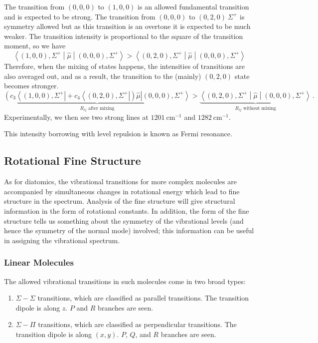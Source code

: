 \documentclass{article}
\theoremstyle{plain}\theoremheaderfont{\normalfont\itshape}\theorembodyfont{\rmfamily}\theoremseparator{.}\newtheorem*{rem}{Remark}\newtheorem*{ex}{Example}\newtheorem*{proof}{Proof}\newtheorem*{altp}{Alternative proof}
\theoremstyle{plain}\theoremheaderfont{\normalfont\bfseries}\theorembodyfont{\rmfamily}\theoremseparator{.}\newtheorem{thm}{Theorem}[section]\newtheorem{lem}[thm]{Lemma}\newtheorem{prop}[thm]{Proposition}\newtheorem*{cor}{Corollary}\newtheorem{defn}[thm]{Definition}\newtheorem{clm}[thm]{Claim}\newtheorem{clminproof}{Claim}\newtheorem{pos}{Postulate}[section]
\theoremstyle{break}\theoremheaderfont{\normalfont\itshape}\theorembodyfont{\rmfamily}\theoremseparator{.\medskip}\newtheorem*{proofskip}{Proof}\newtheorem*{exs}{Examples}\newtheorem*{rems}{Remarks}
\theoremstyle{break}\theoremheaderfont{\normalfont\bfseries}\theorembodyfont{\rmfamily}\theoremseparator{.\medskip}\newtheorem{lemskip}[thm]{Lemma}\newtheorem{defnskip}[thm]{Definition}\newtheorem{propskip}[thm]{Proposition}\newtheorem{thmskip}[thm]{Theorem}
\numberwithin{equation}{section}
\newcommand{\unit}[1]{\ \mathrm{#1}}
\newcommand{\bra}[1]{\left\langle #1 \right|}
\newcommand{\ket}[1]{\left| #1 \right\rangle}
\newcommand{\mel}[3]{\left\langle #1 \middle| #2 \middle| #3 \right\rangle}
\begin{document}
    The transition from \((0,0,0)\) to \((1,0,0)\) is an allowed fundamental transition and is expected to be strong. The transition from \((0,0,0)\) to \((0,2,0)\ \Sigma^+\) is symmetry allowed but as this transition is an overtone it is expected to be much weaker. The transition intensity is proportional to the square of the transition moment, so we have
    \begin{equation}
        \mel{(1,0,0),\Sigma^+}{\hat{\mu}}{(0,0,0),\Sigma^+}>\mel{(0,2,0),\Sigma^+}{\hat{\mu}}{(0,0,0),\Sigma^+}
    \end{equation}
    Therefore, when the mixing of states happens, the intensities of transitions are also averaged out, and as a result, the transition to the (mainly) \((0,2,0)\) state becomes stronger.
    \begin{equation}
        \underbrace{\left(c_3\bra{(1,0,0),\Sigma^+}+c_4\bra{(0,2,0),\Sigma^+}\right)\hat{\mu}\ket{(0,0,0),\Sigma^+}}_{R_{ij}\text{ after mixing}}>\underbrace{\mel{(0,2,0),\Sigma^+}{\hat{\mu}}{(0,0,0),\Sigma^+}}_{R_{ij}\text{ without mixing}}\,.
    \end{equation}
    Experimentally, we then see two strong lines at \(1201\unit{cm}^{-1}\) and \(1282\unit{cm}^{-1}\).

    This intensity borrowing with level repulsion is known as Fermi resonance.

    \subsection{Rotational Fine Structure}
    As for diatomics, the vibrational transitions for more complex molecules are accompanied by simultaneous changes in rotational energy which lead to fine structure in the spectrum. Analysis of the fine structure will give structural information in the form of rotational constants. In addition, the form of the fine structure tells us something about the symmetry of the vibrational levels (and hence the symmetry of the normal mode) involved; this information can be useful in assigning the vibrational spectrum.
    \subsubsection{Linear Molecules}
    The allowed vibrational transitions in such molecules come in two broad types:
    \begin{enumerate}[topsep=0pt,label=(\roman*)]
        \item \(\Sigma-\Sigma\) transitions, which are classified as parallel transitions. The transition dipole is along \(z\). \(P\) and \(R\) branches are seen.
        \item \(\Sigma-\Pi\) transitions, which are classified as perpendicular transitions. The transition dipole is along \((x,y)\). \(P\), \(Q\), and \(R\) branches are seen.
    \end{enumerate}
\end{document}

